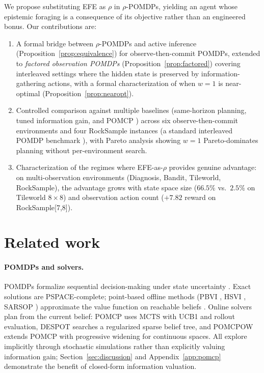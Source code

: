 \documentclass[runningheads]{llncs}
\begin{document}
We propose substituting EFE as $\rho$ in $\rho$-POMDPs, yielding an agent whose epistemic foraging is a consequence of its objective rather than an engineered bonus. Our contributions are:
\begin{enumerate}
    \item A formal bridge between $\rho$-POMDPs and active inference (Proposition~\ref{prop:equivalence}) for observe-then-commit POMDPs, extended to \emph{factored observation POMDPs} (Proposition~\ref{prop:factored}) covering interleaved settings where the hidden state is preserved by information-gathering actions, with a formal characterization of when $w{=}1$ is near-optimal (Proposition~\ref{prop:nearopt}).
    \item Controlled comparison against multiple baselines (same-horizon planning, tuned information gain, and POMCP \citep{silver2010}) across six observe-then-commit environments and four RockSample instances (a standard interleaved POMDP benchmark \citep{smith2004}), with Pareto analysis showing $w{=}1$ Pareto-dominates planning without per-environment search.
    \item Characterization of the regimes where EFE-as-$\rho$ provides genuine advantage: on multi-observation environments (Diagnosis, Bandit, Tileworld, RockSample), the advantage grows with state space size ($66.5\%$ vs.\ $2.5\%$ on Tileworld $8{\times}8$) and observation action count ($+7.82$ reward on RockSample[7,8]).
\end{enumerate}

\section{Related work}

\paragraph{POMDPs and solvers.}
POMDPs formalize sequential decision-making under state uncertainty \citep{smallwood1973, kaelbling1998}. Exact solutions are PSPACE-complete; point-based offline methods (PBVI \citep{pineau2003}, HSVI \citep{smith2004}, SARSOP \citep{kurniawati2008}) approximate the value function on reachable beliefs \citep{shani2013}. Online solvers plan from the current belief: POMCP \citep{silver2010} uses MCTS with UCB1 and rollout evaluation, DESPOT \citep{ye2017} searches a regularized sparse belief tree, and POMCPOW \citep{sunberg2018} extends POMCP with progressive widening for continuous spaces. All explore implicitly through stochastic simulations rather than explicitly valuing information gain; Section~\ref{sec:discussion} and Appendix~\ref{app:pomcp} demonstrate the benefit of closed-form information valuation.
\end{document}
